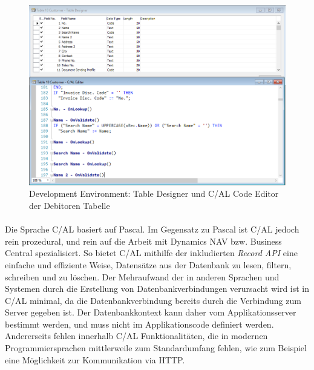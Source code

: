 \begin{figure}[h]
	\centering
	\includegraphics[width=130mm]{images/TableDesigner}
	\caption{Development Environment: Table Designer und C/AL Code Editor der Debitoren Tabelle}
	\label{fig:TableDesignerCodeEditor}
\end{figure}

\paragraph{}
Die Sprache C/AL basiert auf Pascal. Im Gegensatz zu Pascal ist C/AL jedoch rein prozedural, und rein auf die Arbeit mit Dynamics NAV bzw. Business Central spezialisiert. So bietet C/AL mithilfe der inkludierten \textit{Record API} eine einfache und effiziente Weise, Datensätze aus der Datenbank zu lesen, filtern, schreiben und zu löschen. Der Mehraufwand der in anderen Sprachen und Systemen durch die Erstellung von Datenbankverbindungen verursacht wird ist in C/AL minimal, da die Datenbankverbindung bereits durch die Verbindung zum Server gegeben ist. Der Datenbankkontext kann daher vom Applikationsserver bestimmt werden, und muss nicht im Applikationscode definiert werden. Andererseits fehlen innerhalb C/AL Funktionalitäten, die in modernen Programmiersprachen mittlerweile zum Standardumfang fehlen, wie zum Beispiel eine Möglichkeit zur Kommunikation via HTTP.

